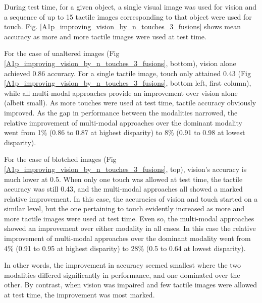 \documentclass[9pt,technote]{IEEEtran}  %
\begin{document}
During test time, for a given object, a single visual image was used for vision and a sequence of up to 15 tactile images corresponding to that object were used for touch. Fig. \ref{A1p_improving_vision_by_n_touches_3_fusions} shows mean accuracy as more and more tactile images were used at test time. 

For the case of unaltered images (Fig \ref{A1p_improving_vision_by_n_touches_3_fusions}, bottom), vision alone achieved 0.86 accuracy. For a single tactile image, touch only attained 0.43 (Fig \ref{A1p_improving_vision_by_n_touches_3_fusions}, bottom left, first column), while all multi-modal approaches provide an improvement over vision alone (albeit small). As more touches were used at test time, tactile accuracy obviously improved. As the gap in performance between the modalities narrowed, the relative improvement of multi-modal approaches over the dominant modality went from 1\% (0.86 to 0.87 at highest disparity) to 8\% (0.91 to 0.98 at lowest disparity).

For the case of blotched images (Fig \ref{A1p_improving_vision_by_n_touches_3_fusions}, top), vision's accuracy is much lower at 0.5. When only one touch was allowed at test time, the tactile accuracy was still 0.43, and the multi-modal approaches all showed a marked relative improvement.
In this case, the accuracies of vision and touch started on a similar level, but the one pertaining to touch evidently increased as more and more tactile images were used at test time. Even so, the multi-modal approaches showed an improvement over either modality in all cases. In this case the relative improvement of multi-modal approaches over the dominant modality went from 4\% (0.91 to 0.95 at highest disparity) to 28\% (0.5 to 0.64 at lowest disparity).

In other words, the improvement in accuracy seemed smallest where the two modalities differed significantly in performance, and one dominated over the other. By contrast, when vision was impaired and few tactile images were allowed at test time, the improvement was most marked.
\begin{figure}
	\centering
\end{figure}
\end{document}
